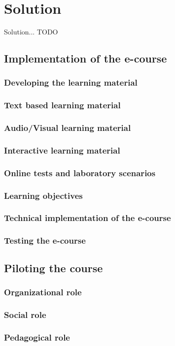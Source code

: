 \chapter{Solution}
\label{solution}
Solution...{\color{red} TODO }

\section{Implementation of the e-course}

\subsection{Developing the learning material}
\subsection{Text based learning material}
\subsection{Audio/Visual learning material}
\subsection{Interactive learning material}
\subsection{Online tests and laboratory scenarios}
\subsection{Learning objectives}
\subsection{Technical implementation of the e-course}
\subsection{Testing the e-course}
\section{Piloting the course}
\subsection{Organizational role}
\subsection{Social role}
\subsection{Pedagogical role}